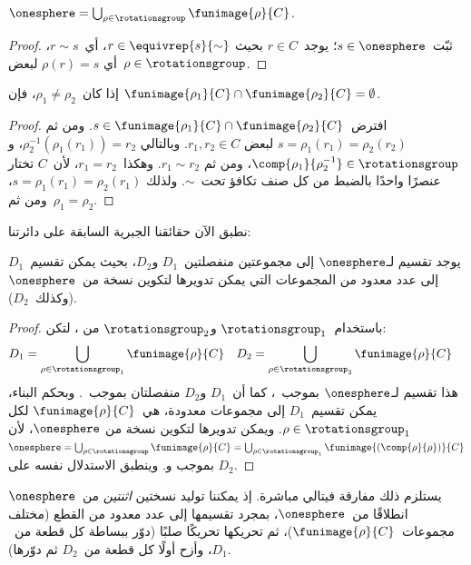\documentclass[../../../include/open-logic-section]{subfiles}
\begin{document}
\begin{lem}
$\onesphere = \bigcup_{\rho \in \rotationsgroup} \funimage{\rho}{C}$.
\end{lem}

\begin{proof}
ثبّت~$s \in \onesphere$؛ يوجد~$r \in C$ بحيث
$r \in \equivrep{s}{\sim}$، أي~$r \sim s$، أي
$\rho(r) = s$ لبعض~$\rho \in \rotationsgroup$.
\end{proof}

\begin{lem}
إذا كان~$\rho_1 \neq \rho_2$، فإن
$\funimage{\rho_1}{C} \cap \funimage{\rho_2}{C} = \emptyset$.
\end{lem}

\begin{proof}
افترض~$s \in \funimage{\rho_{1}}{C} \cap
\funimage{\rho_{2}}{C}$. ومن ثم
$s = \rho_{1}(r_{1}) = \rho_{2}(r_{2})$ لبعض
$r_{1}, r_{2} \in C$. وبالتالي
$\rho^{-1}_2(\rho_1(r_1)) = r_2$، و
$\comp{\rho_1}{\rho^{-1}_2} \in \rotationsgroup$، ومن ثم
$r_{1} \sim r_{2}$. وهكذا~$r_1 = r_2$، لأن~$C$ تختار عنصرًا واحدًا
بالضبط من كل صنف تكافؤ تحت~$\sim$. ولذلك
$s = \rho_1(r_1) = \rho_2(r_1)$، ومن ثم~$\rho_1 = \rho_2$.
\end{proof}

نطبق الآن حقائقنا الجبرية السابقة على دائرتنا:

\begin{lem}
يوجد تقسيم لـ$\onesphere$ إلى مجموعتين منفصلتين~$D_{1}$ و$D_{2}$،
بحيث يمكن تقسيم~$D_{1}$ إلى عدد معدود من المجموعات التي يمكن تدويرها
لتكوين نسخة من~$\onesphere$ (وكذلك~$D_{2}$).
\end{lem}

\begin{proof}
باستخدام~$\rotationsgroup_{1}$ و$\rotationsgroup_{2}$ من
، لتكن:
\begin{align*}
	D_{1} &= \bigcup_{\rho \in \rotationsgroup_1} \funimage{\rho}{C} &
	D_{2} &= \bigcup_{\rho \in \rotationsgroup_2} \funimage{\rho}{C}
\end{align*}
هذا تقسيم لـ$\onesphere$ بموجب~، كما أن~$D_1$
و$D_2$ منفصلتان بموجب~. وبحكم البناء، يمكن
تقسيم~$D_1$ إلى مجموعات معدودة، هي~$\funimage{\rho}{C}$ لكل
$\rho \in \rotationsgroup_1$. ويمكن تدويرها لتكوين نسخة من
$\onesphere$، لأن
$\onesphere = \bigcup_{\rho \in
\rotationsgroup}\funimage{\rho}{C} = \bigcup_{\rho \in
\rotationsgroup_1}\funimage{(\comp{\rho}{\rho})}{C}$ بموجب
 و. وينطبق الاستدلال نفسه على
$D_2$. \end{proof}\noindent
يستلزم ذلك مفارقة فيتالي مباشرة. إذ يمكننا توليد نسختين
\emph{اثنتين} من~$\onesphere$ انطلاقًا من~$\onesphere$، بمجرد تقسيمها
إلى عدد معدود من القطع (مختلف مجموعات~$\funimage{\rho}{C}$)، ثم
تحريكها تحريكًا صلبًا (دوّر ببساطة كل قطعة من~$D_1$، وأزح أولًا كل
قطعة من~$D_2$ ثم دوّرها).
\end{document}
